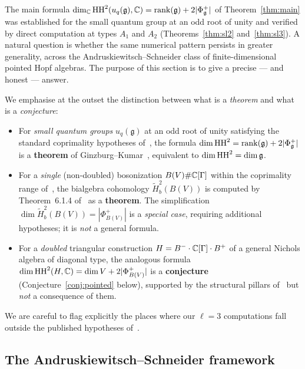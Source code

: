 The main formula $\dim_{\mathbb{C}} \operatorname{HH}^2(u_q(\mathfrak{g}), \mathbb{C}) = \operatorname{rank}(\mathfrak{g}) + 2|\Phi^+_\mathfrak{g}|$ of Theorem~\ref{thm:main} was established for the small quantum group at an odd root of unity and verified by direct computation at types $A_1$ and $A_2$ (Theorems~\ref{thm:sl2} and~\ref{thm:sl3}). A natural question is whether the same numerical pattern persists in greater generality, across the Andruskiewitsch--Schneider class of finite-dimensional pointed Hopf algebras. The purpose of this section is to give a precise --- and honest --- answer.

We emphasise at the outset the distinction between what is a \emph{theorem} and what is a \emph{conjecture}:
\begin{itemize}
\item For \emph{small quantum groups} $u_q(\mathfrak{g})$ at an odd root of unity satisfying the standard coprimality hypotheses of~\cite{GK93}, the formula $\dim \operatorname{HH}^2 = \operatorname{rank}(\mathfrak{g}) + 2|\Phi^+_\mathfrak{g}|$ is a \textbf{theorem} of Ginzburg--Kumar~\cite{GK93}, equivalent to $\dim \operatorname{HH}^2 = \dim \mathfrak{g}$.
\item For a \emph{single} (non-doubled) bosonization $B(V) \# \mathbb{C}[\Gamma]$ within the coprimality range of~\cite{MW08}, the bialgebra cohomology $\tilde{H}^2_b(B(V))$ is computed by Theorem~6.1.4 of~\cite{MW08} as a \textbf{theorem}. The simplification $\dim \tilde{H}^2_b(B(V)) = |\Phi^+_{B(V)}|$ is a \emph{special case}, requiring additional hypotheses; it is \emph{not} a general formula.
\item For a \emph{doubled} triangular construction $H = B^{-} \cdot \mathbb{C}[\Gamma] \cdot B^{+}$ of a general Nichols algebra of diagonal type, the analogous formula $\dim \operatorname{HH}^2(H, \mathbb{C}) = \dim V + 2|\Phi^+_{B(V)}|$ is a \textbf{conjecture} (Conjecture~\ref{conj:pointed} below), supported by the structural pillars of~\cite{AS02,AKM15,MW08} but \emph{not} a consequence of them.
\end{itemize}
We are careful to flag explicitly the places where our $\ell = 3$ computations fall outside the published hypotheses of~\cite{MW08}.

\subsection{The Andruskiewitsch--Schneider framework}
\label{sec:as_framework}

